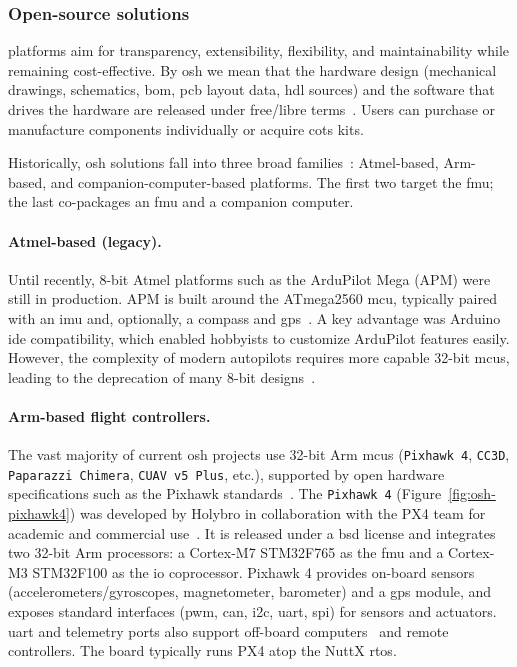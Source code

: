 \subsubsection{Open-source solutions}%
\label{sec:open-source-solut-hw}

 platforms aim for transparency, extensibility, flexibility, and maintainability while remaining cost-effective. 
By \gls{osh} we mean that the hardware design (mechanical drawings, schematics, \gls{bom}, \gls{pcb} layout data, \gls{hdl} sources) and the software that drives the hardware are released under free/libre terms~\cite{freeGNU}. 
Users can purchase or manufacture components individually or acquire \gls{cots} kits.

Historically, \gls{osh} solutions fall into three broad families~\cite{ebeidUAVPlatformsSurvey2017}: Atmel-based, Arm-based, and companion-computer-based platforms. 
The first two target the \gls{fmu}; the last co-packages an \gls{fmu} and a companion computer.

\paragraph{Atmel-based (legacy).}
Until recently, 8-bit Atmel platforms such as the ArduPilot Mega (APM) were still in production. 
APM is built around the ATmega2560 \gls{mcu}, typically paired with an \gls{imu} and, optionally, a compass and \gls{gps}~\cite{ardupilotMega}. 
A key advantage was Arduino \gls{ide} compatibility, which enabled hobbyists to customize ArduPilot features easily. 
However, the complexity of modern autopilots requires more capable 32-bit \glspl{mcu}, leading to the deprecation of many 8-bit designs~\cite{fmu8BitDeprecation}.

\paragraph{Arm-based flight controllers.}
The vast majority of current \gls{osh} projects use 32-bit Arm \glspl{mcu} 
(\lstinline|Pixhawk 4|, \lstinline|CC3D|, \lstinline|Paparazzi Chimera|, \lstinline|CUAV v5 Plus|, etc.), supported by open hardware specifications such as the Pixhawk standards~\cite{pixhawk}. 
The \lstinline|Pixhawk 4| (Figure~\ref{fig:osh-pixhawk4}) was developed by Holybro in collaboration with the PX4 team for academic and commercial use~\cite{pixhawk4}. 
It is released under a \gls{bsd} license and integrates two 32-bit Arm processors: a Cortex-M7 STM32F765 as the \gls{fmu} and a Cortex-M3 STM32F100 as the \gls{io} coprocessor. 
Pixhawk 4 provides on-board sensors (accelerometers/gyroscopes, magnetometer, barometer) and a \gls{gps} module, and exposes standard interfaces (\gls{pwm}, \gls{can}, \gls{i2c}, \gls{uart}, \gls{spi}) for sensors and actuators. 
\gls{uart} and telemetry ports also support off-board computers~\cite{pixhawk4} and remote controllers. 
The board typically runs PX4 atop the NuttX \gls{rtos}.

